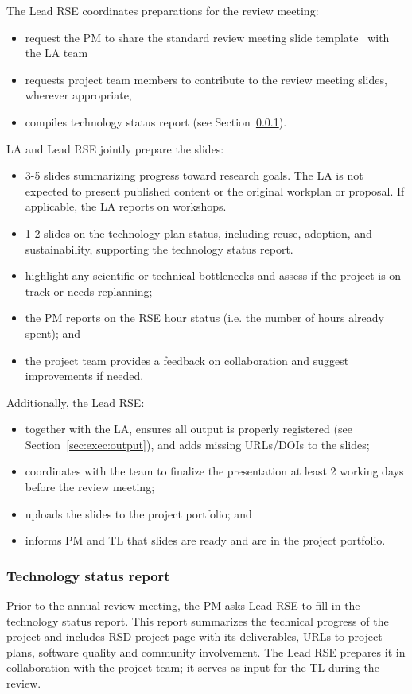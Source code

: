 The Lead RSE coordinates preparations for the review meeting:
\begin{itemize}\itemsep0em
\item request the PM to share the standard review meeting slide template~\cite{proj-portfolio} with the LA team
\item requests project team members to contribute to the review meeting slides, wherever appropriate,
\item compiles technology status report (see Section~\ref{sec:exec:tech}).
\end{itemize}


LA and Lead RSE jointly prepare the slides:
\begin{itemize}\itemsep0em
\item 3-5 slides summarizing progress toward research goals. The LA is not expected to present published content or the
original workplan or proposal. If applicable, the LA reports on workshops.
\item 1-2 slides on the technology plan status, including reuse, adoption, and sustainability, supporting the technology status report.
\item highlight any scientific or technical bottlenecks and assess if the project is on track or needs replanning;
\item the PM reports on the RSE hour status (i.e. the number of hours already spent); and
\item the project team provides a feedback on collaboration and suggest improvements if needed.
\end{itemize}
 
Additionally, the Lead RSE:
\begin{itemize}\itemsep0em
\item together with the LA, ensures all output is properly registered (see Section~\ref{sec:exec:output}), and adds missing URLs/DOIs to the slides;
\item coordinates with the team to finalize the presentation at least 2 working days before the review meeting;
\item uploads the slides to the project portfolio; and
\item informs PM and TL that slides are ready and are in the project portfolio.
\end{itemize}

\subsubsection{Technology status report}
\label{sec:exec:tech}
Prior to the annual review meeting, the PM asks Lead RSE to fill in the technology status report. This report 
summarizes the technical progress of the project and includes RSD project page with its deliverables, URLs
to project plans, software quality and community involvement. The Lead RSE prepares it in collaboration with the project team; it serves as input for the TL during the review.

